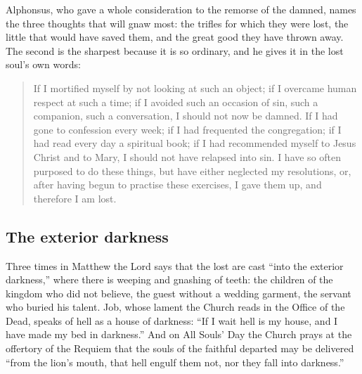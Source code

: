 Alphonsus, who gave a whole consideration to the remorse of the damned, names the three thoughts that will gnaw most: the trifles for which they were lost, the little that would have saved them, and the great good they have thrown away. The second is the sharpest because it is so ordinary, and he gives it in the lost soul's own words:

\begin{quote}
If I mortified myself by not looking at such an object; if I overcame human respect at such a time; if I avoided such an occasion of sin, such a companion, such a conversation, I should not now be damned. If I had gone to confession every week; if I had frequented the congregation; if I had read every day a spiritual book; if I had recommended myself to Jesus Christ and to Mary, I should not have relapsed into sin. I have so often purposed to do these things, but have either neglected my resolutions, or, after having begun to practise these exercises, I gave them up, and therefore I am lost.
\end{quote}

\subsection{The exterior darkness}

Three times in Matthew the Lord says that the lost are cast ``into the exterior darkness,'' where there is weeping and gnashing of teeth: the children of the kingdom who did not believe, the guest without a wedding garment, the servant who buried his talent. Job, whose lament the Church reads in the Office of the Dead, speaks of hell as a house of darkness: ``If I wait hell is my house, and I have made my bed in darkness.'' And on All Souls' Day the Church prays at the offertory of the Requiem that the souls of the faithful departed may be delivered ``from the lion's mouth, that hell engulf them not, nor they fall into darkness.''


